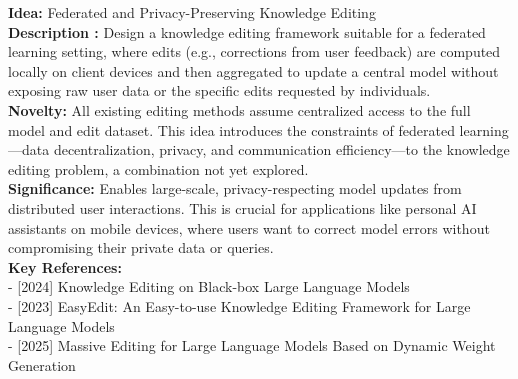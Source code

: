 \begin{tcolorbox}[breakable,colback=persona!20!white, colframe=persona!60!black, title=\textbf{An Example of Idea Generation}]
    \label{box:idea_generation}
    \textbf{Idea:} Federated and Privacy-Preserving Knowledge Editing\\
    \textbf{Description :} Design a knowledge editing framework suitable for a federated learning setting, where edits (e.g., corrections from user feedback) are computed locally on client devices and then aggregated to update a central model without exposing raw user data or the specific edits requested by individuals.\\
    \textbf{Novelty:} All existing editing methods assume centralized access to the full model and edit dataset. This idea introduces the constraints of federated learning—data decentralization, privacy, and communication efficiency—to the knowledge editing problem, a combination not yet explored.\\
    \textbf{Significance:} Enables large-scale, privacy-respecting model updates from distributed user interactions. This is crucial for applications like personal AI assistants on mobile devices, where users want to correct model errors without compromising their private data or queries.\\
    \textbf{Key References:}\\
    - [2024] Knowledge Editing on Black-box Large Language Models\\
    - [2023] EasyEdit: An Easy-to-use Knowledge Editing Framework for Large Language Models\\
    - [2025] Massive Editing for Large Language Models Based on Dynamic Weight Generation
\end{tcolorbox}

